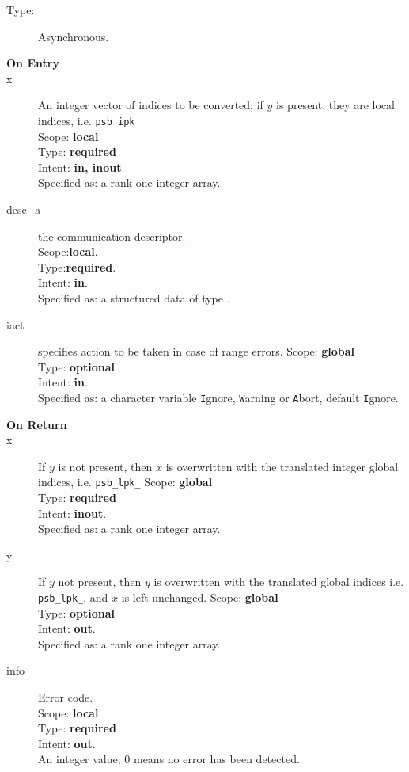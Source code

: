 \begin{description}
\item[Type:] Asynchronous.
\item[\bf On Entry]
\item[x] An integer vector of indices to be converted; if $y$ is present,
 they are local indices, i.e. \verb|psb_ipk_| \\
Scope: {\bf local} \\
Type: {\bf required}\\
Intent: {\bf in, inout}.\\
Specified as: a rank one integer array.\\
\item[desc\_a] the communication descriptor.\\
Scope:{\bf local}.\\
Type:{\bf required}.\\
Intent: {\bf in}.\\
Specified as: a structured data of type \descdata.
\item[iact] specifies action to be taken in case of range errors. 
Scope: {\bf global} \\
Type: {\bf optional}\\
Intent: {\bf in}.\\
Specified as: a character variable  \verb|I|gnore, \verb|W|arning or
\verb|A|bort, default \verb|I|gnore.
\end{description}

\begin{description}
\item[\bf On Return]
\item[x] If $y$ is not present,
  then $x$ is overwritten with the translated integer  global indices, i.e. \verb|psb_lpk_| 
Scope: {\bf global} \\
Type: {\bf required}\\
Intent: {\bf inout}.\\
Specified as: a rank one integer array.
\item[y] If $y$  not present,
  then $y$ is overwritten with the translated global
  indices i.e. \verb|psb_lpk_|, and $x$   is left unchanged. 
Scope: {\bf global} \\
Type: {\bf optional}\\
Intent: {\bf out}.\\
Specified as: a rank one integer array.
\item[info] Error code.\\
Scope: {\bf local} \\
Type: {\bf required} \\
Intent: {\bf out}.\\
An integer value; 0 means no error has been detected. 
\end{description}



